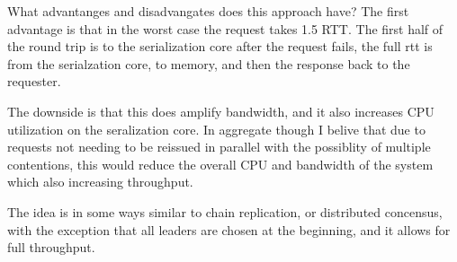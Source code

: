 What advantanges and disadvangates does this approach have? The first
advantage is that in the worst case the request takes 1.5 RTT. The
first half of the round trip is to the serialization core after the
request fails, the full rtt is from the serialzation core, to memory,
and then the response back to the requester. 

The downside is that this does amplify bandwidth, and it also
increases CPU utilization on the seralization core. In aggregate
though I belive that due to requests not needing to be reissued in
parallel with the possiblity of multiple contentions, this would
reduce the overall CPU and bandwidth of the system which also
increasing throughput. 

The idea is in some ways similar to chain replication, or distributed
concensus, with the exception that all leaders are chosen at the
beginning, and it allows for full throughput.


\pagebreak




